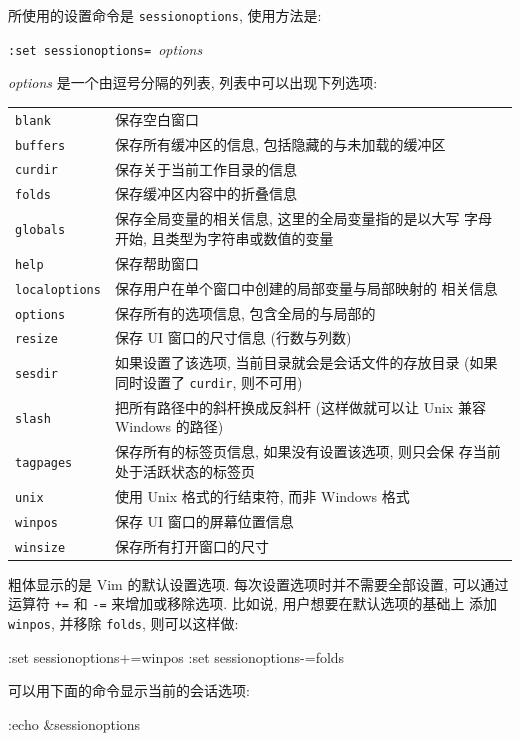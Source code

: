 所使用的设置命令是 \texttt{sessionoptions}, 使用方法是:
\begin{vimcmdform}
\texttt{:set sessionoptions=}\ \textit{options}
\end{vimcmdform}
\textit{options} 是一个由逗号分隔的列表, 列表中可以出现下列选项:
\begin{center}
    \begin{tabular}{ll}
        \hline
        \texttt{blank}  & 保存空白窗口 \\
        \texttt{buffers} & 保存所有缓冲区的信息, 包括隐藏的与未加载的缓冲区 \\
        \texttt{curdir} & 保存关于当前工作目录的信息 \\
        \texttt{folds} & 保存缓冲区内容中的折叠信息 \\
        \texttt{globals} & 保存全局变量的相关信息, 这里的全局变量指的是以大写
        字母开始, 且类型为字符串或数值的变量 \\
        \texttt{help} & 保存帮助窗口 \\
        \texttt{localoptions} & 保存用户在单个窗口中创建的局部变量与局部映射的
        相关信息 \\
        \texttt{options} & 保存所有的选项信息, 包含全局的与局部的 \\
        \texttt{resize} & 保存 UI 窗口的尺寸信息 (行数与列数) \\
        \texttt{sesdir} & 如果设置了该选项, 当前目录就会是会话文件的存放目录
        (如果同时设置了 \texttt{curdir}, 则不可用) \\
        \texttt{slash} & 把所有路径中的斜杆换成反斜杆 (这样做就可以让 Unix 兼容
        Windows 的路径) \\
        \texttt{tagpages} & 保存所有的标签页信息, 如果没有设置该选项, 则只会保
        存当前处于活跃状态的标签页 \\
        \texttt{unix} & 使用 Unix 格式的行结束符, 而非 Windows 格式 \\
        \texttt{winpos} & 保存 UI 窗口的屏幕位置信息 \\
        \texttt{winsize} & 保存所有打开窗口的尺寸 \\
        \hline
    \end{tabular}
\end{center}
粗体显示的是 Vim 的默认设置选项. 每次设置选项时并不需要全部设置, 可以通过运算符
\texttt{+=} 和 \texttt{-=} 来增加或移除选项. 比如说, 用户想要在默认选项的基础上
添加 \texttt{winpos}, 并移除 \texttt{folds}, 则可以这样做:
\begin{vimcode}
:set sessionoptions+=winpos
:set sessionoptions-=folds
\end{vimcode}
可以用下面的命令显示当前的会话选项:
\begin{vimcode}
:echo &sessionoptions
\end{vimcode}

